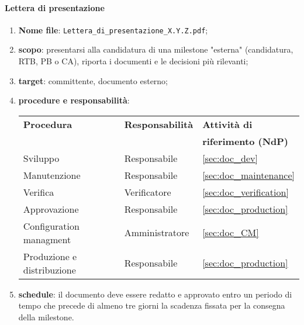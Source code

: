         \paragraph{Lettera di presentazione}
            \begin{enumerate}
                \item \textbf{Nome file}: \texttt{Lettera\_di\_presentazione\_X.Y.Z.pdf};
                \item \textbf{scopo}: presentarsi alla candidatura di una milestone "esterna" (candidatura, RTB, PB o CA), riporta i documenti e le decisioni più rilevanti;
                \item \textbf{target}: committente, documento esterno;
                \item \textbf{procedure e responsabilità}:
                \\
                \begin{tabularx}{0.93\textwidth}{|X|X|X|}
                    \hline
                    \textbf{Procedura} & \textbf{Responsabilità} & \textbf{Attività di} \\
                    & & \textbf{riferimento (NdP)} \\
                    \hline
                    Sviluppo & Responsabile &  \ref{sec:doc_dev}
                    \\\hline
                    Manutenzione & Responsabile & \ref{sec:doc_maintenance}
                    \\\hline
                    Verifica & Verificatore & \ref{sec:doc_verification}
                    \\\hline
                    Approvazione & Responsabile & \ref{sec:doc_production}
                    \\\hline
                    Configuration managment & Amministratore & \ref{sec:doc_CM}
                    \\\hline
                    Produzione e distribuzione & Responsabile & \ref{sec:doc_production}
                    \\\hline
                \end{tabularx}
                \item \textbf{schedule}: il documento deve essere redatto e approvato entro un periodo di tempo che precede di almeno tre giorni la scadenza fissata per la consegna della milestone.
            \end{enumerate} 

